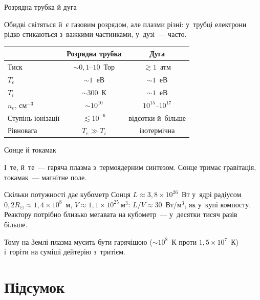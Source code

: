 \documentclass[]{beamer}
\begin{document}
\begin{frame}{Розрядна трубка й дуга}
	\begin{block}{}\justifying\small
		Обидві світяться й~є газовим розрядом, але плазми різні: у~трубці електрони рідко стикаються з~важкими частинками, у~дузі~--- часто.
	\end{block}
	\begin{center}\small
		\begin{tabular}{lcc}
			& Розрядна трубка & Дуга \\ \hline
			Тиск & $\sim0{,}1$--$10$~Тор & $\gtrsim1$~атм \\
			$T_e$ & $\sim1$~еВ & $\sim1$~еВ \\
			$T_i$ & $\sim300$~К & $\sim1$~еВ \\
			$n_e$, см$^{-3}$ & $\sim10^{10}$ & $10^{15}$--$10^{17}$ \\
			Ступінь іонізації & $\lesssim10^{-6}$ & відсотки й~більше \\
			Рівновага & $T_e\gg T_i$ & ізотермічна \\
		\end{tabular}
	\end{center}
\end{frame}

\begin{frame}{Сонце й токамак}
	\begin{block}{}\justifying\small
		І~те, й~те~--- гаряча плазма з~термоядерним синтезом. Сонце тримає \alert{гравітація}, токамак~--- \alert{магнітне поле}.
	\end{block}
	\begin{exampleblock}{Скільки потужності дає кубометр Сонця}\justifying\small
		$L\approx3{,}8\times10^{26}$~Вт у~ядрі радіусом $0{,}2R_\odot\approx1{,}4\times10^{8}$~м, $V\approx1{,}1\times10^{25}~\mathrm{м}^3$:
		$L/V\approx30$~Вт/м$^3$, як у~купі компосту. Реактору потрібно близько мегавата на кубометр~--- у~десятки тисяч разів більше.
	\end{exampleblock}
	\begin{block}{}\justifying\small
		Тому на Землі плазма мусить бути гарячішою ($\sim10^{8}$~К проти $1{,}5\times10^{7}$~К) і~горіти на суміші дейтерію з~тритієм.
	\end{block}
\end{frame}

\section{Підсумок}
\end{document}
